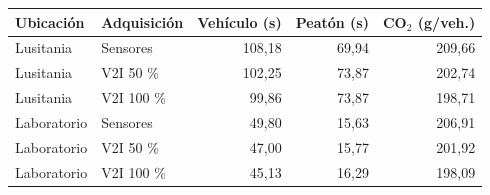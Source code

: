 \begin{tabular}{llrrr}\toprule
Ubicación & Adquisición & Vehículo (s) & Peatón (s) & CO$_2$ (g/veh.)\\\midrule
Lusitania & Sensores & 108,18 & 69,94 & 209,66\\
Lusitania & V2I 50 \% & 102,25 & 73,87 & 202,74\\
Lusitania & V2I 100 \% & 99,86 & 73,87 & 198,71\\
Laboratorio & Sensores & 49,80 & 15,63 & 206,91\\
Laboratorio & V2I 50 \% & 47,00 & 15,77 & 201,92\\
Laboratorio & V2I 100 \% & 45,13 & 16,29 & 198,09\\
\bottomrule\end{tabular}
